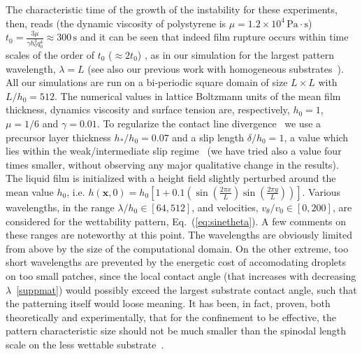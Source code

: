 The characteristic time of the growth of the instability for these experiments, then, reads \cite{fetzerThermalNoiseInfluences2007} (the dynamic viscosity of polystyrene is $\mu = 1.2 \times 10^4 \, \text{Pa} \cdot \text{s}$) $t_0 = \frac{3\mu}{\gamma h_0^3 q_0^4} \approx 300 \, \text{s}$ and it can be seen that indeed film rupture occurs within time scales of the order of $t_0$ ($\approx 2 t_0$) \cite{beckerComplexDewettingScenarios2003}, as in our simulation for the largest pattern wavelength, $\lambda = L$ (see also our previous work with homogeneous substrates~\cite{zitzLatticeBoltzmannSimulations2021}).
All our simulations are run on a bi-periodic square domain of size $L \times L$ with $L/h_0 = 512 $. The numerical values in lattice Boltzmann units of the mean film thickness, dynamics viscosity and surface tension are, respectively, $h_0=1$, $\mu=1/6$ and $\gamma=0.01$.
To regularize the contact line divergence~\cite{huhHydrodynamicModelSteady1971} we use a precursor layer thickness $h_{\ast}/h_0=0.07$ and a slip length $\delta/h_0 = 1$, a value which lies within the weak/intermediate slip regime~\cite{peschkaSignaturesSlipDewetting2019,fetzerQuantifyingHydrodynamicSlip2007, munchLubricationModelsSmall2005} (we have tried also a value four times smaller, without observing any major qualitative change in the results).
The liquid film is initialized with a height field slightly perturbed around the mean value $h_0$, i.e. $h(\mathbf{x},0) = h_0 \left[1 + 0.1 \left(\sin\left(\frac{2\pi x}{L}\right)\sin\left(\frac{2\pi y}{L}\right)\right)\right]$.
Various wavelengths, in the range $\lambda/h_0 \in [64, 512]$, and velocities, $v_{\theta}/v_0 \in [0, 200]$, are considered for the wettability pattern, Eq.~(\ref{eq:sinetheta}). 
A few comments on these ranges are noteworthy at this point. 
The wavelengths are obviously limited from above by the size of the computational domain. On the other extreme, too short wavelengths are prevented by the energetic cost of accomodating droplets on too small patches, since the local contact angle (that increases with decreasing $\lambda$~\ref{suppmat}) would possibly exceed the largest substrate contact angle, such that the patterning itself would loose meaning. 
It has been, in fact, proven, both theoretically and experimentally, that for the confinement to be effective, the pattern characteristic size should not be much smaller than the spinodal length scale on the less wettable substrate~\cite{karguptaMorphologicalSelforganizationDewetting2002,karguptaInstabilityPatternFormation2000,nisatoExcitationSurfaceDeformation1999,karimPhaseSeparationUltrathin1998}.
